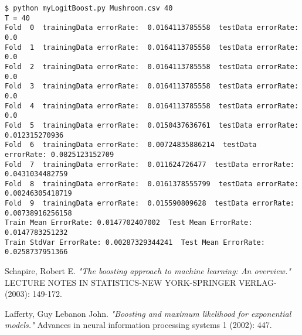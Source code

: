 \documentclass[12pt]{amsart}
\begin{document}
\begin{verbatim}
$ python myLogitBoost.py Mushroom.csv 40
T = 40
Fold  0  trainingData errorRate:  0.0164113785558  testData errorRate: 0.0
Fold  1  trainingData errorRate:  0.0164113785558  testData errorRate: 0.0
Fold  2  trainingData errorRate:  0.0164113785558  testData errorRate: 0.0
Fold  3  trainingData errorRate:  0.0164113785558  testData errorRate: 0.0
Fold  4  trainingData errorRate:  0.0164113785558  testData errorRate: 0.0
Fold  5  trainingData errorRate:  0.0150437636761  testData errorRate: 0.012315270936
Fold  6  trainingData errorRate:  0.00724835886214  testData errorRate: 0.0825123152709
Fold  7  trainingData errorRate:  0.011624726477  testData errorRate: 0.0431034482759
Fold  8  trainingData errorRate:  0.0161378555799  testData errorRate: 0.00246305418719
Fold  9  trainingData errorRate:  0.015590809628  testData errorRate: 0.00738916256158
Train Mean ErrorRate: 0.0147702407002  Test Mean ErrorRate: 0.0147783251232
Train StdVar ErrorRate: 0.00287329344241  Test Mean ErrorRate: 0.0258737951366
\end{verbatim}

\begin{thebibliography}{10}

 Schapire, Robert E. \textit{"The boosting approach to machine learning: An overview."} LECTURE NOTES IN STATISTICS-NEW YORK-SPRINGER VERLAG- (2003): 149-172.

 Lafferty, Guy Lebanon John. \textit{"Boosting and maximum likelihood for exponential models."} Advances in neural information processing systems 1 (2002): 447.

\end{thebibliography}
\end{document}
